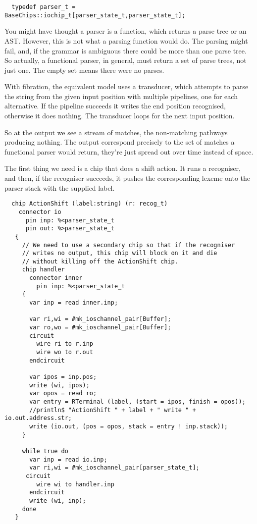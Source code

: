 \documentclass[oneside]{book}
\begin{document}
\begin{verbatim}
  typedef parser_t = BaseChips::iochip_t[parser_state_t,parser_state_t];
\end{verbatim}

You might have thought a parser is a function, which returns a parse
tree or an AST. However, this is not what a parsing function would
do. The parsing might fail, and, if the grammar is ambiguous there
could be more than one parse tree. So actually, a functional
parser, in general, must return a set of parse trees, not just one.
The empty set means there were no parses.

With fibration, the equivalent model uses a transducer, which attempts
to parse the string from the given input position with multiple
pipelines, one for each alternative. If the pipeline succeeds it
writes the end position recognised, otherwise it does nothing.
The transducer loops for the next input position.

So at the output we see a stream of matches, the non-matching
pathways producing nothing. The output correspond precisely
to the set of matches a functional parser would return,
they're just spread out over time instead of space.

The first thing we need is a chip that does a shift action.
It runs a recogniser, and then, if the recogniser succeeds,
it pushes the corresponding lexeme onto the parser stack
with the supplied label.

\begin{verbatim}
  chip ActionShift (label:string) (r: recog_t)
    connector io
      pin inp: %<parser_state_t
      pin out: %>parser_state_t
   {
     // We need to use a secondary chip so that if the recogniser
     // writes no output, this chip will block on it and die
     // without killing off the ActionShift chip.
     chip handler 
       connector inner
         pin inp: %<parser_state_t
     {
       var inp = read inner.inp;

       var ri,wi = #mk_ioschannel_pair[Buffer];
       var ro,wo = #mk_ioschannel_pair[Buffer];
       circuit 
         wire ri to r.inp
         wire wo to r.out
       endcircuit

       var ipos = inp.pos;
       write (wi, ipos);
       var opos = read ro;
       var entry = RTerminal (label, (start = ipos, finish = opos));
       //println$ "ActionShift " + label + " write " + io.out.address.str;
       write (io.out, (pos = opos, stack = entry ! inp.stack));
     }

     while true do
       var inp = read io.inp;
       var ri,wi = #mk_ioschannel_pair[parser_state_t];
      circuit
         wire wi to handler.inp
       endcircuit
       write (wi, inp);
     done
   }
\end{verbatim}
\end{document}
